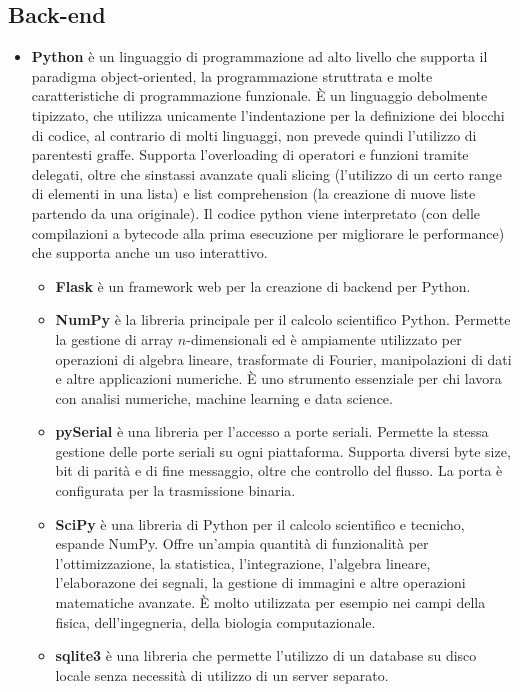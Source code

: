 \documentclass[12pt,a4paper,openright,twoside, openany]{book}
\begin{document}
\subsection{Back-end}
\begin{itemize}
    \item \textbf{Python} è un linguaggio di programmazione ad alto livello che supporta il paradigma object-oriented, la programmazione struttrata e molte caratteristiche di programmazione funzionale. È un linguaggio debolmente tipizzato, che utilizza unicamente l'indentazione per la definizione dei blocchi di codice, al contrario di molti linguaggi, non prevede quindi l'utilizzo di parentesti graffe. Supporta l'overloading di operatori e funzioni tramite delegati, oltre che sinstassi avanzate quali slicing (l'utilizzo di un certo range di elementi in una lista) e list comprehension (la creazione di nuove liste partendo da una originale). Il codice python viene interpretato (con delle compilazioni a bytecode alla prima esecuzione per migliorare le performance) che supporta anche un uso interattivo.
    \begin{itemize}[noitemsep]
        \item \textbf{Flask} è un framework web per la creazione di backend per Python.
        \item \textbf{NumPy} è la libreria principale per il calcolo scientifico Python. Permette la gestione di array $n$-dimensionali ed è ampiamente utilizzato per operazioni di algebra lineare, trasformate di Fourier, manipolazioni di dati e altre applicazioni numeriche. È uno strumento essenziale per chi lavora con analisi numeriche, machine learning e data science.
        \item \textbf{pySerial} è una libreria per l'accesso a porte seriali. Permette la stessa gestione delle porte seriali su ogni piattaforma. Supporta diversi byte size, bit di parità e di fine messaggio, oltre che controllo del flusso. La porta è configurata per la trasmissione binaria.
        \item \textbf{SciPy} è una libreria di Python per il calcolo scientifico e tecnicho, espande NumPy. Offre un'ampia quantità di funzionalità per l'ottimizzazione, la statistica, l'integrazione, l'algebra lineare, l'elaborazone dei segnali, la gestione di immagini e altre operazioni matematiche avanzate. È molto utilizzata per esempio nei campi della fisica, dell'ingegneria, della biologia computazionale.
        \item \textbf{sqlite3} è una libreria che permette l'utilizzo di un database su disco locale senza necessità di utilizzo di un server separato.
    \end{itemize}
\end{itemize}
\end{document}
